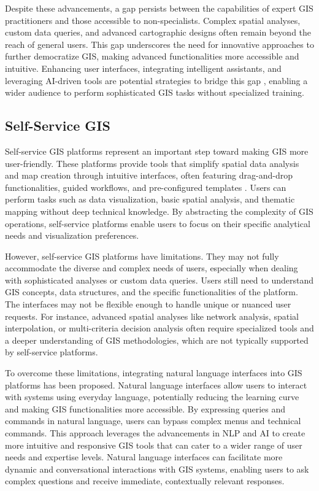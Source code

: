Despite these advancements, a gap persists between the capabilities of expert GIS practitioners and those accessible to non-specialists. Complex spatial analyses, custom data queries, and advanced cartographic designs often remain beyond the reach of general users. This gap underscores the need for innovative approaches to further democratize GIS, making advanced functionalities more accessible and intuitive. Enhancing user interfaces, integrating intelligent assistants, and leveraging AI-driven tools are potential strategies to bridge this gap \cite{Frez2023252}, enabling a wider audience to perform sophisticated GIS tasks without specialized training.

\subsection{Self-Service GIS}

Self-service GIS platforms represent an important step toward making GIS more user-friendly. These platforms provide tools that simplify spatial data analysis and map creation through intuitive interfaces, often featuring drag-and-drop functionalities, guided workflows, and pre-configured templates \cite{rowland_towards_2020}. Users can perform tasks such as data visualization, basic spatial analysis, and thematic mapping without deep technical knowledge. By abstracting the complexity of GIS operations, self-service platforms enable users to focus on their specific analytical needs and visualization preferences.

However, self-service GIS platforms have limitations. They may not fully accommodate the diverse and complex needs of users, especially when dealing with sophisticated analyses or custom data queries. Users still need to understand GIS concepts, data structures, and the specific functionalities of the platform. The interfaces may not be flexible enough to handle unique or nuanced user requests. For instance, advanced spatial analyses like network analysis, spatial interpolation, or multi-criteria decision analysis often require specialized tools and a deeper understanding of GIS methodologies, which are not typically supported by self-service platforms.

To overcome these limitations, integrating natural language interfaces into GIS platforms has been proposed. Natural language interfaces allow users to interact with systems using everyday language, potentially reducing the learning curve and making GIS functionalities more accessible. By expressing queries and commands in natural language, users can bypass complex menus and technical commands. This approach leverages the advancements in NLP and AI to create more intuitive and responsive GIS tools that can cater to a wider range of user needs and expertise levels. Natural language interfaces can facilitate more dynamic and conversational interactions with GIS systems, enabling users to ask complex questions and receive immediate, contextually relevant responses.

